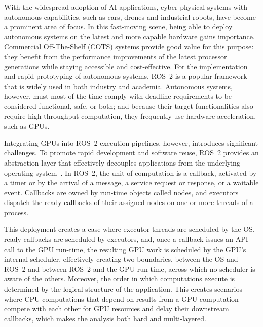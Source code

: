 With the widespread adoption of AI applications, cyber-physical systems with autonomous capabilities, such as cars, drones and industrial robots, have become a prominent area of focus. In this fast-moving scene, being able to deploy autonomous systems on the latest and more capable hardware gains importance. Commercial Off-The-Shelf (COTS) systems provide good value for this purpose: they benefit from the performance improvements of the latest processor generations while staying accessible and cost-effective. For the implementation and rapid prototyping of autonomous systems, ROS~2 is a popular framework that is widely used in both industry and academia. Autonomous systems, however, must most of the time comply with deadline requirements to be considered functional, safe, or both; and because their target functionalities also require high-throughput computation, they frequently use hardware acceleration, such as GPUs.

Integrating GPUs into ROS~2 execution pipelines, however, introduces significant challenges. To promote rapid development and software reuse, ROS~2 provides an abstraction layer that effectively decouples applications from the underlying operating system~\cite{wu-2026-adssota}. In ROS~2, the unit of computation is a callback, activated by a timer or by the arrival of a message, a service request or response, or a waitable event. Callbacks are owned by run-time objects called nodes, and executors dispatch the ready callbacks of their assigned nodes on one or more threads of a process.

This deployment creates a case where executor threads are scheduled by the OS, ready callbacks are scheduled by executors, and, once a callback issues an API call to the GPU run-time, the resulting GPU work is scheduled by the GPU's internal scheduler, effectively creating two boundaries, between the OS and ROS~2 and between ROS~2 and the GPU run-time, across which no scheduler is aware of the others. Moreover, the order in which computations execute is determined by the logical structure of the application. This creates scenarios where CPU computations that depend on results from a GPU computation compete with each other for GPU resources and delay their downstream callbacks, which makes the analysis both hard and multi-layered.

